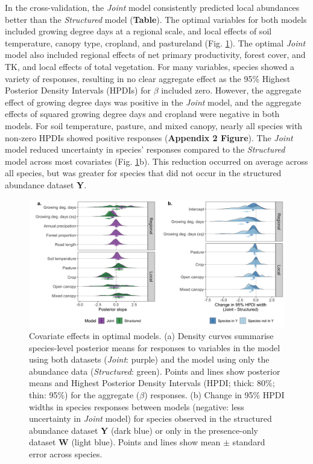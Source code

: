 \documentclass[preprint,review,times,12pt]{elsarticle}
\begin{document}
In the cross-validation, the \emph{Joint} model consistently predicted local abundances better than the \emph{Structured} model (\textbf{Table}). The optimal variables for both models included growing degree days at a regional scale, and local effects of soil temperature, canopy type, cropland, and pastureland (Fig. \ref{fig:slope_means}). The optimal \emph{Joint} model also included regional effects of net primary productivity, forest cover, and TK, and local effects of total vegetation. For many variables, species showed a variety of responses, resulting in no clear aggregate effect as the 95\% Highest Posterior Density Intervals (HPDIs) for $\beta$ included zero. However, the aggregate effect of growing degree days was positive in the \emph{Joint} model, and the aggregate effects of squared growing degree days and cropland were negative in both models. For soil temperature, pasture, and mixed canopy, nearly all species with non-zero HPDIs showed positive responses (\textbf{Appendix 2 Figure}). The \emph{Joint} model reduced uncertainty in species' responses compared to the \emph{Structured} model across most covariates (Fig. \ref{fig:slope_means}b). This reduction occurred on average across all species, but was greater for species that did not occur in the structured abundance dataset \textbf{Y}.

\begin{figure}
\centering\includegraphics[width=6in]{ms/1_Ecography/1/figs/slope_means+HDI.png}
\caption{\label{fig:slope_means} Covariate effects in optimal models. (a) Density curves summarise species-level posterior means for responses to variables in the model using both datasets (\emph{Joint}: purple) and the model using only the abundance data (\emph{Structured}: green). Points and lines show posterior means and Highest Posterior Density Intervals (HPDI; thick: 80\%; thin: 95\%) for the aggregate ($\beta$) responses. (b) Change in 95\% HPDI widths in species responses between models (negative: less uncertainty in \emph{Joint} model) for species observed in the structured abundance dataset \textbf{Y} (dark blue) or only in the presence-only dataset \textbf{W} (light blue). Points and lines show mean $\pm$ standard error across species. }
\end{figure}
\end{document}
